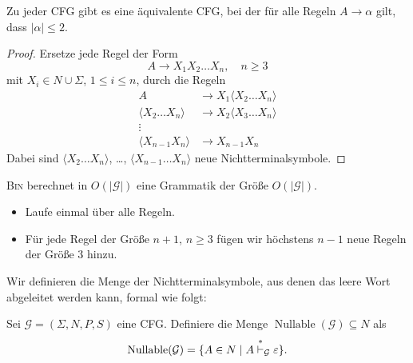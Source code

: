 \begin{lemma}
  Zu jeder \ac{CFG} gibt es eine äquivalente \ac{CFG}, bei der für alle Regeln $A \to \alpha$ gilt, dass $|\alpha| \le 2$.
\end{lemma}
\begin{proof}
  Ersetze jede Regel der Form 
  \begin{displaymath}
    A \to X_1X_2\ldots X_n, \quad n\geq 3
  \end{displaymath}
  mit $X_i \in N \cup \Sigma$, $1 \le i \le n$,
  durch die Regeln 
  \begin{align*}
    A &\to X_1\langle  X_2\ldots X_n \rangle \\
    \langle  X_2\ldots X_n \rangle & \to X_2\langle  X_3\ldots X_n \rangle \\
    \vdots \\
    \langle  X_{n-1}X_n \rangle & \to X_{n-1}X_n
  \end{align*}
  Dabei sind  $\langle  X_2\ldots X_n \rangle$, \ldots, $\langle  X_{n-1}\ldots X_n \rangle$ neue Nichtterminalsymbole.
\end{proof}
\begin{Bemerkung}
\textsc{Bin} berechnet in $O(|\mathcal{G}|)$ eine Grammatik der Größe $O(|\mathcal{G}|)$.
\begin{itemize}
	\item Laufe einmal über alle Regeln.
	
	\item Für jede Regel der Größe $n+1$, $n\geq 3$ fügen wir höchstens $n-1$ neue Regeln der Größe 3 hinzu.
	\qedhere
\end{itemize}
\end{Bemerkung}


Wir definieren die Menge der Nichtterminalsymbole, aus denen das leere Wort abgeleitet werden kann, formal wie folgt:
\begin{Def}
  Sei $\mathcal{G} = (\Sigma, N, P, S)$ eine \ac{CFG}.
  Definiere die Menge $\operatorname{Nullable}(\mathcal{G}) \subseteq N$ als
  \begin{displaymath}
    \operatorname{Nullable}(\mathcal{G}) = \{ A \in N \mid A
    \stackrel{*}{\vdash}_\mathcal{G} \varepsilon \}
    \text{.} \qedhere
  \end{displaymath}
\end{Def}

